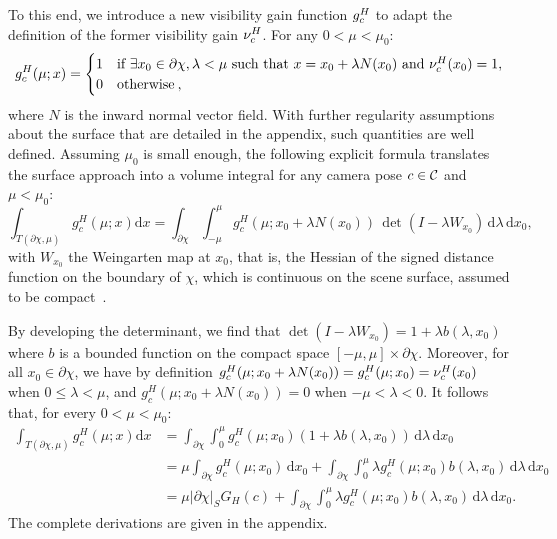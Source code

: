 To this end, we introduce a new visibility gain function $g_c^H$ to adapt the definition of the former visibility gain $\nu_c^H$. For any $0<\mu<\mu_0$:
%
\begin{equation}
        g_{c}^H(\mu; x) = 
        \begin{cases}
            1 & \text{if } \exists x_0 \in \partial\chi, \lambda <\mu \text{ such that } x = x_0 + \lambda N(x_0) \text{ and } \nu_c^H(x_0) = 1,\\
            0 & \text{otherwise} \> ,
        \end{cases}
\end{equation}
%
where $N$ is the inward normal vector field. With further regularity assumptions about the surface that are detailed in the appendix, such quantities are well defined. Assuming $\mu_0$ is small enough, the following explicit formula translates the surface approach into a volume integral for any camera pose $c \in {\cal C}$ and $\mu < \mu_0$:
%
\begin{equation}
    \label{eqn:link_volume_surface}
    \int_{T(\partial\chi, \mu)}  g_c^H(\mu; x) \text{d}x
    = \int_{\partial\chi} \int_{-\mu}^\mu g_c^H(\mu; x_0 + \lambda N(x_0))\,\det(I-\lambda W_{x_0})\,\text{d}\lambda\,\text{d}x_0,
\end{equation}
%
with $W_{x_0}$ the Weingarten map at $x_0$, that is, the Hessian of the signed distance function on the boundary of $\chi$, which is continuous on the scene surface, assumed to be compact~\cite{gilbarg}. 



By developing the determinant, we find that $\det(I - \lambda W_{x_0}) = 1 + \lambda b(\lambda, x_0)$ where $b$ is a bounded function on the compact space $[-\mu, \mu] \times \partial \chi$. Moreover, for all $x_0\in \partial\chi$, we have by definition $g_c^H(\mu;x_0 + \lambda N(x_0)) = g_c^H(\mu;x_0) = \nu_c^H(x_0)$ when $0 \leq \lambda < \mu$, and $g_c^H(\mu;x_0 + \lambda N(x_0))= 0$ when $-\mu < \lambda < 0$. It follows that, for every $0<\mu<\mu_0$:
%
\begin{equation}
\begin{split}
    \int_{T(\partial\chi, \mu)}  g_c^H(\mu;x) \text{d}x & = \int_{\partial\chi} \int_{0}^\mu g_c^H(\mu;x_0)(1 + \lambda b(\lambda, x_0)) \,\text{d}\lambda \,\text{d}x_0\\
    & = \mu \int_{\partial\chi} g_c^H(\mu;x_0) \,\text{d}x_0 + \int_{\partial\chi} \int_{0}^\mu \lambda g_c^H(\mu;x_0) b(\lambda, x_0)\,\text{d}\lambda \,\text{d}x_0\\
    & = \mu |\partial\chi|_S G_H(c) + \int_{\partial\chi} \int_{0}^\mu \lambda g_c^H(\mu;x_0) b(\lambda, x_0)\,\text{d}\lambda \,\text{d}x_0.
\end{split}
\end{equation}
%
The complete derivations are given in the appendix.

